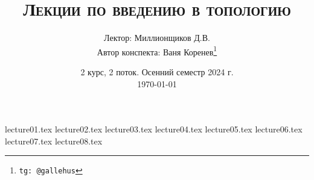 \documentclass[a4paper]{article}
\title{\scshape {Лекции по введению в топологию}}
\date{2 курс, 2 поток. Осенний семестр 2024 г. \\ \today}
\author{Лектор: Миллионщиков Д.В. \\ Автор конспекта: Ваня Коренев\thanks{\texttt{tg: @gallehus}}}
\begin{document}
\maketitle
\newpage
\tableofcontents

\newpage

{lecture01.tex}
{lecture02.tex}
{lecture03.tex}
{lecture04.tex}
{lecture05.tex}
{lecture06.tex}
{lecture07.tex}
{lecture08.tex}
\end{document}
